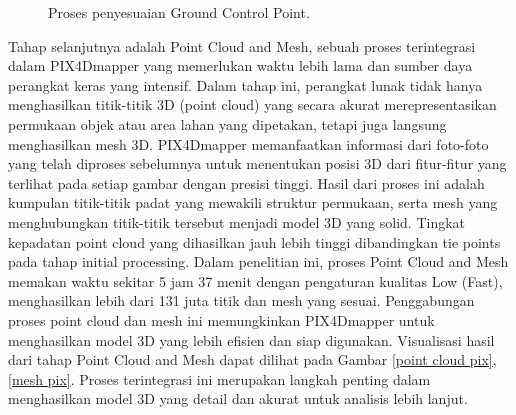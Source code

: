 \begin{figure} [H]
    \centering
    \caption{Proses penyesuaian Ground Control Point.}
    \label{gcpakurat pix}
\end{figure}

Tahap selanjutnya adalah Point Cloud and Mesh, sebuah proses terintegrasi dalam PIX4Dmapper yang memerlukan waktu lebih lama dan sumber daya perangkat keras yang intensif. Dalam tahap ini, perangkat lunak tidak hanya menghasilkan titik-titik 3D (point cloud) yang secara akurat merepresentasikan permukaan objek atau area lahan yang dipetakan, tetapi juga langsung menghasilkan mesh 3D. PIX4Dmapper memanfaatkan informasi dari foto-foto yang telah diproses sebelumnya untuk menentukan posisi 3D dari fitur-fitur yang terlihat pada setiap gambar dengan presisi tinggi. Hasil dari proses ini adalah kumpulan titik-titik padat yang mewakili struktur permukaan, serta mesh yang menghubungkan titik-titik tersebut menjadi model 3D yang solid. Tingkat kepadatan point cloud yang dihasilkan jauh lebih tinggi dibandingkan tie points pada tahap initial processing. Dalam penelitian ini, proses Point Cloud and Mesh memakan waktu sekitar 5 jam 37 menit dengan pengaturan kualitas Low (Fast), menghasilkan lebih dari 131 juta titik dan mesh yang sesuai. Penggabungan proses point cloud dan mesh ini memungkinkan PIX4Dmapper untuk menghasilkan model 3D yang lebih efisien dan siap digunakan. Visualisasi hasil dari tahap Point Cloud and Mesh dapat dilihat pada Gambar \ref{point cloud pix}, \ref{mesh pix}. Proses terintegrasi ini merupakan langkah penting dalam menghasilkan model 3D yang detail dan akurat untuk analisis lebih lanjut.

